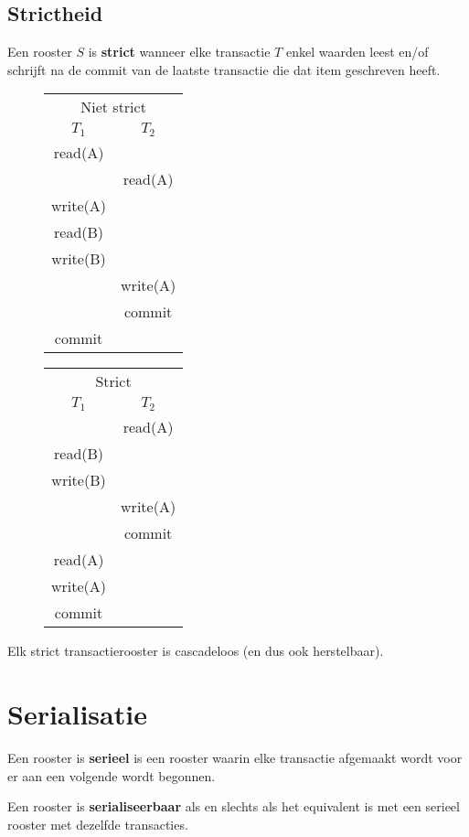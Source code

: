 \documentclass[transacties.tex]{subfiles}
\begin{document}
\subsection{Strictheid}
\begin{de}
Een rooster $S$ is \textbf{strict} wanneer elke transactie $T$ enkel waarden leest en/of schrijft na de commit van de laatste transactie die dat item geschreven heeft.
\end{de}
\begin{figure}[H]
\centering
\begin{tabular}{c|c}
\multicolumn{2}{c}{Niet strict}\\
$T_1$&$T_2$\\
\hline
read(A) &\\
& read(A)\\
write(A)&\\
read(B)&\\
write(B)&\\
&write(A)\\
&commit\\
commit&
\end{tabular}
\begin{tabular}{c|c}
\multicolumn{2}{c}{Strict}\\
$T_1$&$T_2$\\
\hline
& read(A)\\
read(B)&\\
write(B)&\\
& write(A)\\
&commit\\
read(A)&\\
write(A)&\\
commit&
\end{tabular}
\end{figure}
\begin{ei}
Elk strict transactierooster is cascadeloos (en dus ook herstelbaar).
\end{ei}

\section{Serialisatie}
\begin{de}
Een rooster is \textbf{serieel} is een rooster waarin elke transactie afgemaakt wordt voor er aan een volgende wordt begonnen.
\end{de}
\begin{de}
Een rooster is \textbf{serialiseerbaar} als en slechts als het equivalent is met een serieel rooster met dezelfde transacties.
\end{de}
\end{document}
